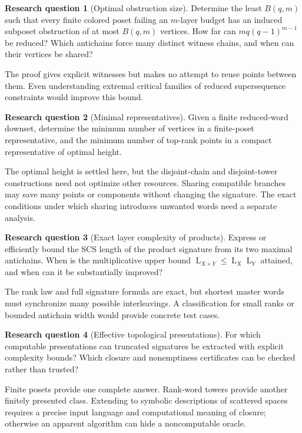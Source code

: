\documentclass[11pt,letterpaper]{article}
\numberwithin{equation}{section}
\theoremstyle{definition}
\theoremstyle{remark}
\theoremstyle{definition}
\newtheorem{question}{Research question}
\newcommand{\layers}{\operatorname{L}}
\begin{document}
\begin{question}[Optimal obstruction size]\label{cw:q:obstruction}
Determine the least $B(q,m)$ such that every finite colored poset failing an
$m$-layer budget has an induced subposet obstruction of at most $B(q,m)$
vertices. How far can $mq(q-1)^{m-1}$ be reduced? Which antichains force
many distinct witness chains, and when can their vertices be shared?
\end{question}
The proof gives explicit witnesses but makes no attempt to reuse points
between them. Even understanding extremal critical families of reduced
supersequence constraints would improve this bound.

\begin{question}[Minimal representatives]\label{cw:q:representatives}
Given a finite reduced-word downset, determine the minimum number of vertices
in a finite-poset representative, and the minimum number of top-rank points
in a compact representative of optimal height.
\end{question}
The optimal height is settled here, but the disjoint-chain and disjoint-tower
constructions need not optimize other resources. Sharing compatible branches
may save many points or components without changing the signature. The exact
conditions under which sharing introduces unwanted words need a separate
analysis.

\begin{question}[Exact layer complexity of products]\label{cw:q:products}
Express or efficiently bound the SCS length of the product signature from
its two maximal antichains. When is the multiplicative upper bound
$\layers_{X\times Y}\le\layers_X\layers_Y$ attained, and when can it be substantially improved?
\end{question}
The rank law and full signature formula are exact, but shortest master words
must synchronize many possible interleavings. A classification for small
ranks or bounded antichain width would provide concrete test cases.

\begin{question}[Effective topological presentations]\label{cw:q:effective}
For which computable presentations can truncated signatures be extracted
with explicit complexity bounds? Which closure and nonemptiness certificates
can be checked rather than trusted?
\end{question}
Finite posets provide one complete answer. Rank-word towers provide another
finitely presented class. Extending to symbolic descriptions of scattered
spaces requires a precise input language and computational meaning of
closure; otherwise an apparent algorithm can hide a noncomputable oracle.
\end{document}
